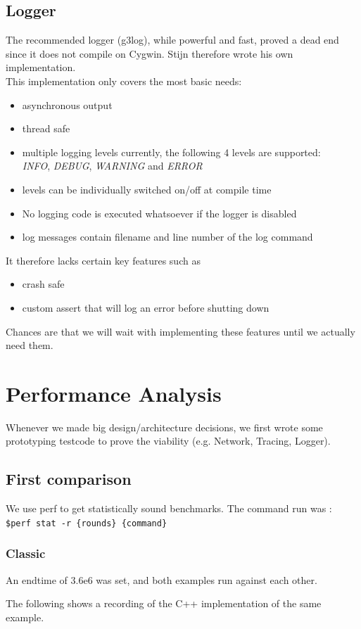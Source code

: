 \documentclass[8pt,a4paper]{report}
\begin{document}
\section{Logger}
The recommended logger (g3log), while powerful and fast, proved a dead end since it does not compile on Cygwin. 
Stijn therefore wrote his own implementation.\\
This implementation only covers the most basic needs:
\begin{itemize}
	\item asynchronous output
	\item thread safe
	\item multiple logging levels currently, the following 4 levels are supported:\\
		\emph{INFO}, \emph{DEBUG}, \emph{WARNING} and \emph{ERROR}
	\item levels can be individually switched on/off at compile time
	\item No logging code is executed whatsoever if the logger is disabled
	\item log messages contain filename and line number of the log command
\end{itemize}
It therefore lacks certain key features such as
\begin{itemize}
	\item crash safe
	\item custom assert that will log an error before shutting down
\end{itemize}
Chances are that we will wait with implementing these features until we actually need them.
\chapter{Performance Analysis}
Whenever we made big design/architecture decisions, we first wrote some prototyping testcode to prove the viability (e.g. Network, Tracing, Logger).
\section{First comparison}
We use perf to get statistically sound benchmarks. The command run was :
\lstinline!$perf stat -r {rounds} {command}!\\

\subsection{Classic}
An endtime of 3.6e6 was set, and both examples run against each other.

The following shows a recording of the C++ implementation of the same example.\\

\end{document}
